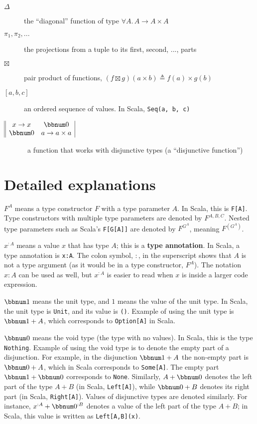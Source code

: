\begin{description}
\item [{$\Delta$}] the \textsf{``}diagonal\textsf{''} function of type $\forall A.\,A\rightarrow A\times A$
\item [{$\pi_{1},\pi_{2},...$}] the projections from a tuple to its first,
second, ..., parts
\item [{$\boxtimes$}] pair product of functions, $(f\boxtimes g)(a\times b)\triangleq f(a)\times g(b)$
\item [{$\left[a,b,c\right]$}] an ordered sequence of values. In Scala,
\lstinline!Seq(a, b, c)!
\item [{$\begin{array}{||cc|}
x\rightarrow x & \bbnum 0\\
\bbnum 0 & a\rightarrow a\times a
\end{array}$}] ~a function that works with disjunctive types (a \textsf{``}disjunctive
function\textsf{''})
\end{description}

\section{Detailed explanations}

$F^{A}$ means a type constructor $F$ with a type parameter $A$.
In Scala, this is \lstinline!F[A]!. Type constructors with multiple
type parameters are denoted by $F^{A,B,C}$. Nested type parameters
such as Scala\textsf{'}s \lstinline!F[G[A]]! are denoted by $F^{G^{A}}$,
meaning $F^{(G^{A})}$.

$x^{:A}$ means a value $x$ that has type $A$; this is a \textbf{type
annotation}. In Scala, a type annotation is \lstinline!x:A!. The
colon symbol, $:$, in the superscript shows that $A$ is not a type
argument (as it would be in a type constructor, $F^{A}$). The notation
$x:A$ can be used as well, but $x^{:A}$ is easier to read when $x$
is inside a larger code expression. 

$\bbnum 1$ means the unit type, and $1$ means
the value of the unit type. In Scala, the unit type is \lstinline!Unit!,
and its value is \lstinline!()!. Example of using the unit type is
$\bbnum 1+A$, which corresponds to \lstinline!Option[A]! in Scala.

$\bbnum 0$ means the void type (the type with no
values). In Scala, this is the type \lstinline!Nothing!. Example
of using the void type is to denote the empty part of a disjunction.
For example, in the disjunction $\bbnum 1+A$ the non-empty part is
$\bbnum 0+A$, which in Scala corresponds to \lstinline!Some[A]!.
The empty part $\bbnum 1+\bbnum 0$ corresponds to \lstinline!None!.
Similarly, $A+\bbnum 0$ denotes the left part of the type $A+B$
(in Scala, \lstinline!Left[A]!), while $\bbnum 0+B$ denotes its
right part (in Scala, \lstinline!Right[A]!). Values of disjunctive
types are denoted similarly. For instance, $x^{:A}+\bbnum 0^{:B}$
denotes a value of the left part of the type $A+B$; in Scala, this
value is written as \lstinline!Left[A,B](x)!.

